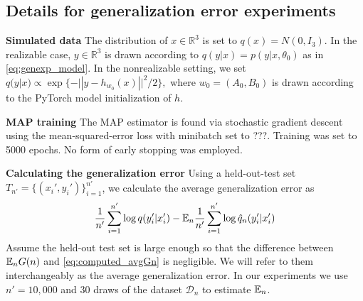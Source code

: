 \documentclass{article} %
\begin{document}
\subsection{Details for generalization error experiments}
\label{appendix:generalizaton}

\textbf{Simulated data}
The distribution of $x \in \mathbb R^3$ is set to $q(x)=N(0,I_3)$. 
In the realizable case, $y \in \mathbb R^3$ is drawn according to $q(y|x) = p(y|x,\theta_0)$ as in \eqref{eq:genexp_model}. In the nonrealizable setting, we set $q(y|x) \propto \exp\{-|| y - h_{w_0}(x) ||^2/2\},$ where $w_0 = (A_0,B_0)$ is drawn according to the PyTorch model initialization of $h$.


\textbf{MAP training}
The MAP estimator is found via stochastic gradient descent using the mean-squared-error loss with minibatch set to ???. Training was set to 5000 epochs. No form of early stopping was employed.

\textbf{Calculating the generalization error}
Using a held-out-test set $T_{n'} = \{(x_i',y_i')\}_{i=1}^{n'}$, we calculate the average generalization error as
\begin{equation}
\frac{1}{n'} \sum_{i=1}^{n'} \log q(y_i'|x_i') - {\mathbb{E}}_n \frac{1}{n'} \sum_{i=1}^{n'} \log \hat q_n(y_i'|x_i')
\label{eq:computed_avgGn}
\end{equation}
Assume the held-out test set is large enough so that the difference between ${\mathbb{E}}_n G(n)$ and \eqref{eq:computed_avgGn} is negligible. We will refer to them interchangeably as the average generalization error. In our experiments we use $n' = 10,000$ and $30$ draws of the dataset $\mathcal{D}_n$ to estimate ${\mathbb{E}}_n$.
\end{document}
